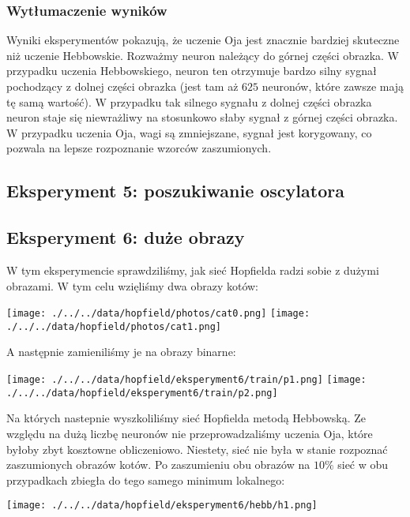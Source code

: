 \documentclass{article}
\begin{document}
\subsubsection{Wytłumaczenie wyników}
Wyniki eksperymentów pokazują, że uczenie Oja jest znacznie bardziej skuteczne niż uczenie Hebbowskie.
Rozważmy neuron należący do górnej części obrazka. W przypadku uczenia Hebbowskiego, neuron ten otrzymuje bardzo silny sygnał
pochodzący z dolnej części obrazka (jest tam aż $625$ neuronów, które zawsze mają tę samą wartość). W przypadku tak silnego sygnału
z dolnej części obrazka neuron staje się niewrażliwy na stosunkowo słaby sygnał z górnej części obrazka.
W przypadku uczenia Oja, wagi są zmniejszane, sygnał jest korygowany, co pozwala na lepsze rozpoznanie wzorców zaszumionych.

\subsection{Eksperyment 5: poszukiwanie oscylatora}

\subsection{Eksperyment 6: duże obrazy}
W tym eksperymencie sprawdziliśmy, jak sieć Hopfielda radzi sobie z dużymi obrazami.
W tym celu wzięliśmy dwa obrazy kotów:
\begin{center}
    \texttt{[image: ./../../data/hopfield/photos/cat0.png]}
    \texttt{[image: ./../../data/hopfield/photos/cat1.png]}
\end{center}
A następnie zamieniliśmy je na obrazy binarne:
\begin{center}
    \texttt{[image: ./../../data/hopfield/eksperyment6/train/p1.png]}
    \texttt{[image: ./../../data/hopfield/eksperyment6/train/p2.png]}
\end{center}
Na których nastepnie wyszkoliliśmy sieć Hopfielda metodą Hebbowską. Ze względu na dużą liczbę neuronów
nie przeprowadzaliśmy uczenia Oja, które byłoby zbyt kosztowne obliczeniowo.
Niestety, sieć nie była w stanie rozpoznać zaszumionych obrazów kotów.
Po zaszumieniu obu obrazów na $10\%$ sieć w obu przypadkach zbiegła do tego samego minimum lokalnego:
\begin{center}
    \texttt{[image: ./../../data/hopfield/eksperyment6/hebb/h1.png]}
\end{center}
\end{document}
